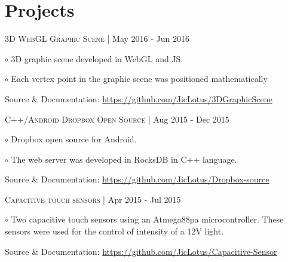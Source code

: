 \documentclass[letterpaper]{article}
\renewenvironment{itemize}{
  \begin{list}{}{
    \setlength{\leftmargin}{1.5em}
  }
}{
  \end{list}
}
\newenvironment{no-indent-itemize}{
  \begin{list}{}{
    \setlength{\leftmargin}{0em}
  }
}{
  \end{list}
}
\def\bullet{$\circ$\xspace}
\begin{document}
\section*{Projects}
\begin{no-indent-itemize}
    
    \item \textsc{3D WebGL Graphic Scene} | May 2016 - Jun 2016
    \begin{itemize}
    \item\bullet 3D graphic scene developed in WebGL and JS.
    \item\bullet Each vertex point in the graphic scene was positioned mathematically
    \end{itemize}
    \begin{itemize}
    \item Source \& Documentation: \href{https://github.com/JicLotus/3DGraphicScene}{https://github.com/JicLotus/3DGraphicScene}
    
    \end{itemize}

    \item \textsc{C++/Android Dropbox Open Source} | Aug 2015 - Dec 2015
    \begin{itemize}
        \item\bullet Dropbox open source for Android.
        \item\bullet The web server was developed in RocksDB in C++ language.
        \end{itemize}    
    \begin{itemize}
        \item Source \& Documentation:
        \href{https://github.com/JicLotus/Dropbox-source}{https://github.com/JicLotus/Dropbox-source}
    \end{itemize}

    \item \textsc{Capacitive touch sensors} |  Apr 2015 - Jul 2015

    \begin{itemize}
        \item\bullet Two capacitive touch sensors using an Atmega88pa microcontroller. These sensors were used for the control of intensity of a 12V light.
        
        Source \& Documentation: \href{https://github.com/JicLotus/Capacitive-Sensor}{https://github.com/JicLotus/Capacitive-Sensor}
    \end{itemize}

\end{no-indent-itemize}
\end{document}
